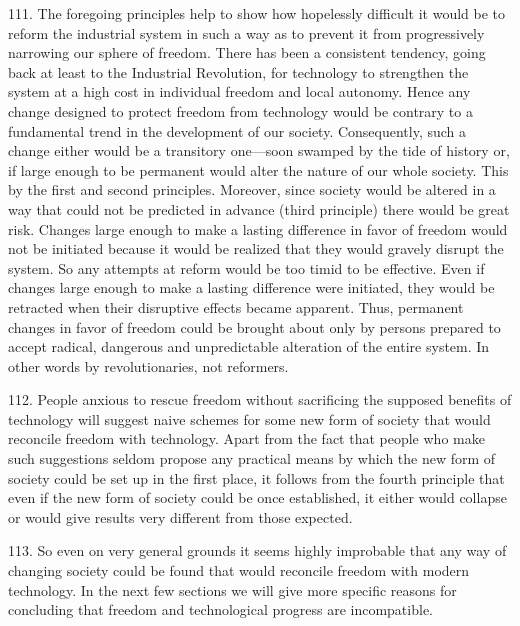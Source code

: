 \documentclass{article}
\begin{document}
\hspace{0.5cm} 111. The foregoing principles help to show how hopelessly difficult it would be to reform the 
industrial system in such a way as to prevent it from progressively narrowing our sphere of 
freedom. There has been a consistent tendency, going back at least to the Industrial Revolution, 
for technology to strengthen the system at a high cost in individual freedom and local 
autonomy. Hence any change designed to protect freedom from technology would be contrary to 
a fundamental trend in the development of our society. Consequently, such a change either would 
be a transitory one—soon swamped by the tide of history or, if large enough to be permanent 
would alter the nature of our whole society. This by the first and second principles. Moreover, 
since society would be altered in a way that could not be predicted in advance (third principle) 
there would be great risk. Changes large enough to make a lasting difference in favor of freedom 
would not be initiated because it would be realized that they would gravely disrupt the system. So 
any attempts at reform would be too timid to be effective. Even if changes large enough to make 
a lasting difference were initiated, they would be retracted when their disruptive effects became 
apparent. Thus, permanent changes in favor of freedom could be brought about only by persons 
prepared to accept radical, dangerous and unpredictable alteration of the entire system. In other 
words by revolutionaries, not reformers. \vspace{\baselineskip}

112. People anxious to rescue freedom without sacrificing the supposed benefits of technology 
will suggest naive schemes for some new form of society that would reconcile freedom with 
technology. Apart from the fact that people who make such suggestions seldom propose any 
practical means by which the new form of society could be set up in the first place, it follows from 
the fourth principle that even if the new form of society could be once established, it either would 
collapse or would give results very different from those expected. \vspace{\baselineskip}

113. So even on very general grounds it seems highly improbable that any way of changing society 
could be found that would reconcile freedom with modern technology. In the next few sections 
we will give more specific reasons for concluding that freedom and technological progress are 
incompatible. 
\end{document}
